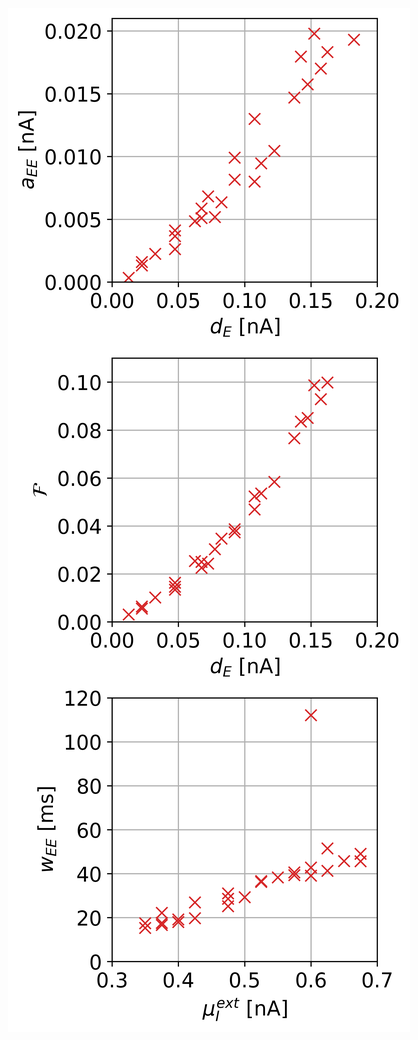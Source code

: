 \documentclass[]{article}
\begin{document}
\begin{minipage}{0.33\textwidth}
	\includegraphics[width=\textwidth]{../rate_1.png}
\end{minipage}
\end{document}
